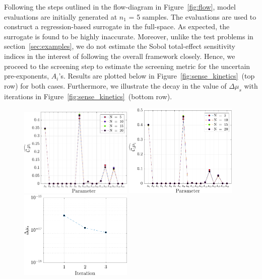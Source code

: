 Following the steps outlined in the flow-diagram in Figure~\ref{fig:flow}, model
evaluations are initially generated at $n_1$ = 5 samples. The evaluations are
used to construct a regression-based surrogate in the full-space. As
expected, the surrogate is found to be highly inaccurate. Moreover, unlike the
test problems in section~\ref{sec:examples}, we do not estimate the Sobol
total-effect sensitivity indices in the interest of following the overall framework
closely. Hence, we proceed to the screening step to estimate the screening metric
for the uncertain pre-exponents, $A_i$'s. Results are plotted below
in Figure~\ref{fig:sense_kinetics}~(top row) for both cases. Furthermore, we illustrate
the decay in the value of $\Delta\mu_s$ with iterations in 
Figure~\ref{fig:sense_kinetics}~(bottom row). 

\begin{figure}[htbp]
 \begin{center}
  \includegraphics[width=0.48\textwidth]{./Figures/ub_conv_kinetics_rich}
  \includegraphics[width=0.48\textwidth]{./Figures/ub_conv_kinetics_lean}
  \\ \vspace{2mm}
  \includegraphics[width=0.48\textwidth]{./Figures/mu_rich}

\end{center}
\end{figure}
